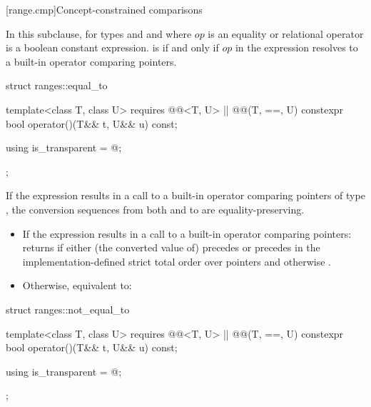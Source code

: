 [range.cmp]{Concept-constrained comparisons}

\pnum
In this subclause,  for types 
and  and where $op$ is an equality or relational
operator is a boolean constant expression.
 is  if and only if $op$
in the expression  resolves to a built-in
operator comparing pointers.

%
\begin{itemdecl}
struct ranges::equal_to {
  template<class T, class U>
    requires @@<T, U> || @@(T, ==, U)
    constexpr bool operator()(T&& t, U&& u) const;

  using is_transparent = @\unspecnc@;
};
\end{itemdecl}

\begin{itemdescr}
\pnum
\expects
If the expression 
results in a call to a built-in operator \tcode{==} comparing pointers of type
, the conversion sequences from both  and  to 
are equality-preserving.

\pnum
\effects
\begin{itemize}
\item
  If the expression  results in
  a call to a built-in operator \tcode{==} comparing pointers:
  returns  if either (the converted value of)  precedes
   or  precedes  in the implementation-defined strict
  total order over pointers and otherwise .

\item
  Otherwise, equivalent to:
\end{itemize}
\end{itemdescr}

%
\begin{itemdecl}
struct ranges::not_equal_to {
  template<class T, class U>
    requires @@<T, U> || @@(T, ==, U)
    constexpr bool operator()(T&& t, U&& u) const;

  using is_transparent = @\unspecnc@;
};
\end{itemdecl}

